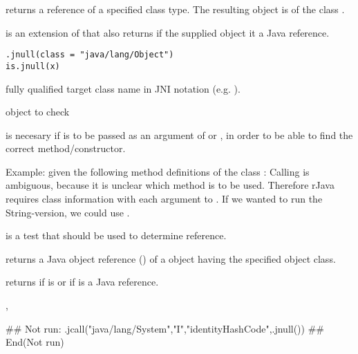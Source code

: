 \begin{Description}\relax
{} returns a  reference of a specified class
type. The resulting object is of the class .

 is an extension of  that also returns
 if the supplied object it a  Java reference.
\end{Description}
\begin{Usage}
\begin{verbatim}
.jnull(class = "java/lang/Object")
is.jnull(x)
\end{verbatim}
\end{Usage}
\begin{Arguments}
\begin{ldescription}
\item[\code{class}] fully qualified target class name in JNI notation
(e.g. ).
\item[\code{x}] object to check
\end{ldescription}
\end{Arguments}
\begin{Details}\relax
{} is necesary if  is to be passed as an
argument of  or , in order to be
able to find the correct method/constructor.

Example: given the following method definitions of the class :
Calling  is ambiguous, because it is
unclear which method is to be used. Therefore rJava requires class
information with each argument to . If we wanted
to run the String-version, we could use
.

 is a test that should be used to determine 
reference.
\end{Details}
\begin{Value}
 returns a Java object reference () of a
 object having the specified object class.

 returns  if  is
 or if  is a Java  reference.
\end{Value}
\begin{SeeAlso}\relax
{}, 
\end{SeeAlso}
\begin{Examples}
\begin{ExampleCode}
## Not run: 
.jcall("java/lang/System","I","identityHashCode",.jnull())
## End(Not run)
\end{ExampleCode}
\end{Examples}

